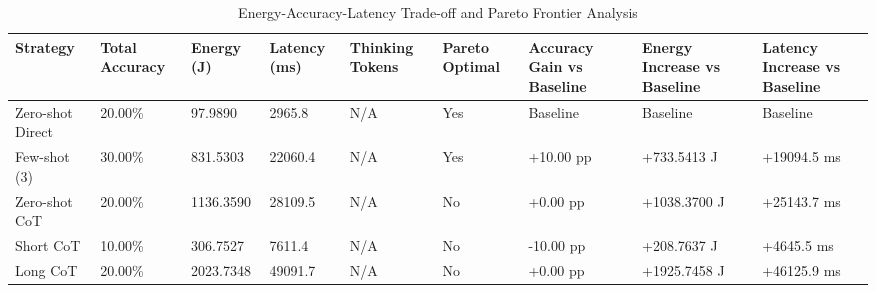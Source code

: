 \begin{table}
\caption{Energy-Accuracy-Latency Trade-off and Pareto Frontier Analysis}
\label{tab:tradeoff_comparison}
\begin{tabular}{lllllllll}
\toprule
Strategy & Total Accuracy & Energy (J) & Latency (ms) & Thinking Tokens & Pareto Optimal & Accuracy Gain vs Baseline & Energy Increase vs Baseline & Latency Increase vs Baseline \\
\midrule
Zero-shot Direct & 20.00\% & 97.9890 & 2965.8 & N/A & Yes & Baseline & Baseline & Baseline \\
Few-shot (3) & 30.00\% & 831.5303 & 22060.4 & N/A & Yes & +10.00 pp & +733.5413 J & +19094.5 ms \\
Zero-shot CoT & 20.00\% & 1136.3590 & 28109.5 & N/A & No & +0.00 pp & +1038.3700 J & +25143.7 ms \\
Short CoT & 10.00\% & 306.7527 & 7611.4 & N/A & No & -10.00 pp & +208.7637 J & +4645.5 ms \\
Long CoT & 20.00\% & 2023.7348 & 49091.7 & N/A & No & +0.00 pp & +1925.7458 J & +46125.9 ms \\
\bottomrule
\end{tabular}
\end{table}
